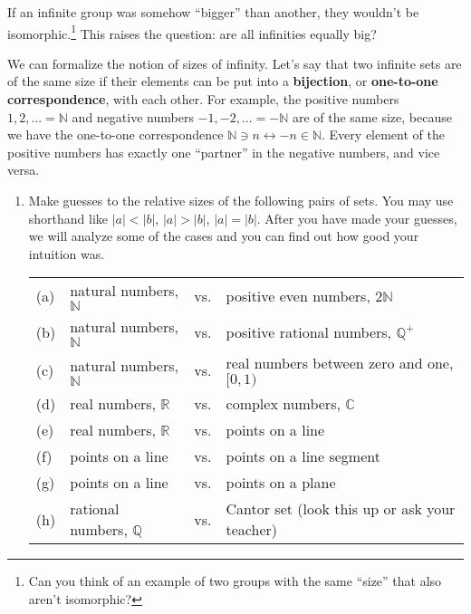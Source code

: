 \documentclass[../gatm.tex]{subfiles}
\begin{document}
If an infinite group was somehow ``bigger'' than another, they wouldn't be isomorphic.\footnote{Can you think of an example of two groups with the same ``size'' that also aren't isomorphic?} This raises the question: are all infinities equally big?

We can formalize the notion of sizes of infinity. Let's say that two infinite sets are of the same size if their elements can be put into a \textbf{bijection}, or \textbf{one-to-one correspondence}, with each other. For example, the positive numbers ${1,2,...}=\mathbb{N}$ and negative numbers ${-1,-2,...}=-\mathbb{N}$ are of the same size, because we have the one-to-one correspondence $\mathbb{N} \ni n\leftrightarrow -n \in \mathbb{N}$. Every element of the positive numbers has exactly one ``partner'' in the negative numbers, and vice versa.

\begin{enumerate}
\setcounter{enumi}{\value{inf_problem_i}}
\item Make guesses to the relative sizes of the following pairs of sets. You may use shorthand like $|a| < |b|$, $|a| > |b|$, $|a| = |b|$. After you have made your guesses, we will analyze some of the cases and you can find out how good your intuition was.

\begin{tabular}{llll} %
(a) & natural numbers, $\mathbb{N}$ & vs. & positive even numbers, $2\mathbb{N}$ \\
(b) & natural numbers, $\mathbb{N}$ & vs. & positive rational numbers, $\mathbb{Q}^+$ \\
(c) & natural numbers, $\mathbb{N}$ & vs. & real numbers between zero and one, $[0,1)$ \\
(d) & real numbers, $\mathbb{R}$ & vs. & complex numbers, $\mathbb{C}$ \\
(e) & real numbers, $\mathbb{R}$ & vs. & points on a line \\
(f) & points on a line & vs. & points on a line segment \\
(g) & points on a line & vs. & points on a plane \\
(h) & rational numbers, $\mathbb{Q}$ & vs. & Cantor set (look this up or ask your teacher) \\ %
\end{tabular}

\setcounter{inf_problem_i}{\value{enumi}}
\end{enumerate}
\end{document}
